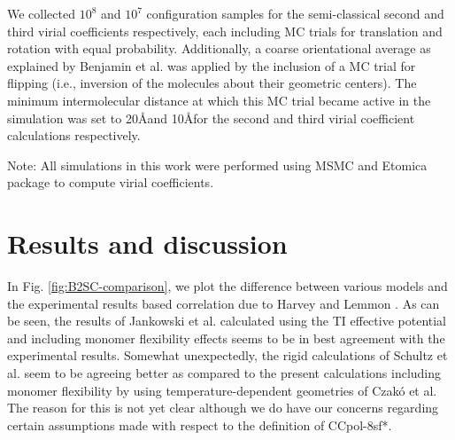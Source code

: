         We collected $10^8$ and $10^7$ configuration samples for the semi-classical second and third virial coefficients respectively, each including MC trials for translation and rotation with equal probability. Additionally, a coarse orientational average as explained by Benjamin et al. \cite{Benjamin2009} was applied by the inclusion of a MC trial for flipping (i.e., inversion of the molecules about their geometric centers). The minimum intermolecular distance at which this MC trial became active in the simulation was set to 20\AA and 10\AA for the second and third virial coefficient calculations respectively.

        Note: All simulations in this work were performed using MSMC and Etomica \cite{Schultz2015Etomica} package to compute virial coefficients.
\section{Results and discussion}
    \label{sec:results}
        In Fig. \ref{fig:B2SC-comparison}, we plot the difference between various models and the experimental results based correlation due to Harvey and Lemmon \cite{Harvey2004}. As can be seen, the results of Jankowski et al. \cite{Jankowski2015} calculated using the TI effective potential and including monomer flexibility effects seems to be in best agreement with the experimental results. Somewhat unexpectedly, the rigid calculations of Schultz et al. \cite{Schultz2015} seem to be agreeing better as compared to the present calculations including monomer flexibility by using temperature-dependent geometries of Czak\'{o} et al. The reason for this is not yet clear although we do have our concerns regarding certain assumptions made with respect to the definition of CCpol-8sf*.
